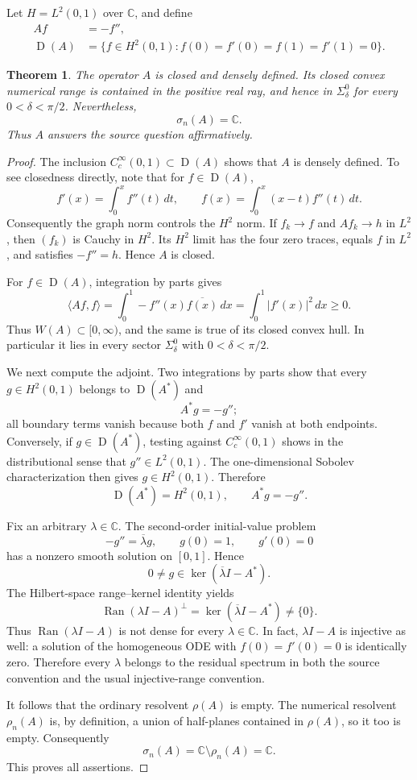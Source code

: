 \documentclass[11pt]{article}
\newtheorem{theorem}{Theorem}
\newcommand{\C}{\mathbb C}
\newcommand{\ran}{\operatorname{Ran}}
\newcommand{\dom}{\operatorname{D}}
\begin{document}
Let $H=L^2(0,1)$ over $\C$, and define
\[
 \begin{split}
  Af&=-f'',\\
  \dom(A)&=\{f\in H^2(0,1):
  f(0)=f'(0)=f(1)=f'(1)=0\}.
 \end{split}
\]

\begin{theorem}
The operator $A$ is closed and densely defined.  Its closed convex numerical range is contained in the positive real ray, and hence in $\Sigma_\delta^0$ for every $0<\delta<\pi/2$.  Nevertheless,
\[
 \sigma_n(A)=\C.
\]
Thus $A$ answers the source question affirmatively.
\end{theorem}

\begin{proof}
The inclusion $C_c^\infty(0,1)\subset\dom(A)$ shows that $A$ is densely defined.  To see closedness directly, note that for $f\in\dom(A)$,
\[
 f'(x)=\int_0^x f''(t)\,dt,
 \qquad
 f(x)=\int_0^x (x-t)f''(t)\,dt.
\]
Consequently the graph norm controls the $H^2$ norm.  If $f_k\to f$ and $Af_k\to h$ in $L^2$, then $(f_k)$ is Cauchy in $H^2$.  Its $H^2$ limit has the four zero traces, equals $f$ in $L^2$, and satisfies $-f''=h$.  Hence $A$ is closed.

For $f\in\dom(A)$, integration by parts gives
\[
 \langle Af,f\rangle
 =\int_0^1 -f''(x)\overline{f(x)}\,dx
 =\int_0^1 |f'(x)|^2\,dx\ge0.
\]
Thus $W(A)\subset[0,\infty)$, and the same is true of its closed convex hull.  In particular it lies in every sector $\Sigma_\delta^0$ with $0<\delta<\pi/2$.

We next compute the adjoint.  Two integrations by parts show that every $g\in H^2(0,1)$ belongs to $\dom(A^*)$ and
\[
 A^*g=-g'';
\]
all boundary terms vanish because both $f$ and $f'$ vanish at both endpoints.  Conversely, if $g\in\dom(A^*)$, testing against $C_c^\infty(0,1)$ shows in the distributional sense that $g''\in L^2(0,1)$.  The one-dimensional Sobolev characterization then gives $g\in H^2(0,1)$.  Therefore
\[
 \dom(A^*)=H^2(0,1),\qquad A^*g=-g''.
\]

Fix an arbitrary $\lambda\in\C$.  The second-order initial-value problem
\[
 -g''=\overline\lambda g,\qquad g(0)=1,\qquad g'(0)=0
\]
has a nonzero smooth solution on $[0,1]$.  Hence
\[
 0\ne g\in\ker(\overline\lambda I-A^*).
\]
The Hilbert-space range--kernel identity yields
\[
 \ran(\lambda I-A)^\perp
 =\ker(\overline\lambda I-A^*)\ne\{0\}.
\]
Thus $\ran(\lambda I-A)$ is not dense for every $\lambda\in\C$.  In fact, $\lambda I-A$ is injective as well: a solution of the homogeneous ODE with $f(0)=f'(0)=0$ is identically zero.  Therefore every $\lambda$ belongs to the residual spectrum in both the source convention and the usual injective-range convention.

It follows that the ordinary resolvent $\rho(A)$ is empty.  The numerical resolvent $\rho_n(A)$ is, by definition, a union of half-planes contained in $\rho(A)$, so it too is empty.  Consequently
\[
 \sigma_n(A)=\C\setminus\rho_n(A)=\C.
\]
This proves all assertions.
\end{proof}
\end{document}

